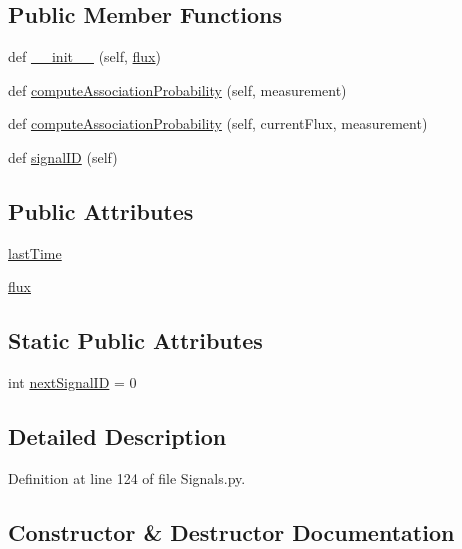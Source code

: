 \subsection*{Public Member Functions}
\begin{DoxyCompactItemize}
\item 
def \hyperlink{classSignals_1_1StaticPoissonSource_a71ff9a86dc2d7e1a89e5f40e0de5f20e}{\+\_\+\+\_\+init\+\_\+\+\_\+} (self, \hyperlink{classSignals_1_1PoissonSource_a26e7bf25b1d9195bfded2a3ad6790bce}{flux})
\item 
def \hyperlink{classSignals_1_1StaticPoissonSource_a61351ebf4f75f28e227cfee7ca7e5d64}{compute\+Association\+Probability} (self, measurement)
\item 
def \hyperlink{classSignals_1_1PoissonSource_a8e7a6023e7ee53ed0b5b81c7d0aa361c}{compute\+Association\+Probability} (self, current\+Flux, measurement)
\item 
def \hyperlink{classSignals_1_1SignalSource_a85016cca8a7f1e188d314ced50577d05}{signal\+ID} (self)
\end{DoxyCompactItemize}
\subsection*{Public Attributes}
\begin{DoxyCompactItemize}
\item 
\hyperlink{classSignals_1_1PoissonSource_a66b0f3fb48cc130b6b07d7427092a522}{last\+Time}
\item 
\hyperlink{classSignals_1_1PoissonSource_a26e7bf25b1d9195bfded2a3ad6790bce}{flux}
\end{DoxyCompactItemize}
\subsection*{Static Public Attributes}
\begin{DoxyCompactItemize}
\item 
int \hyperlink{classSignals_1_1SignalSource_abcff0d069f17cb5ebe3eff15b6283a64}{next\+Signal\+ID} = 0
\end{DoxyCompactItemize}


\subsection{Detailed Description}


Definition at line 124 of file Signals.\+py.



\subsection{Constructor \& Destructor Documentation}
